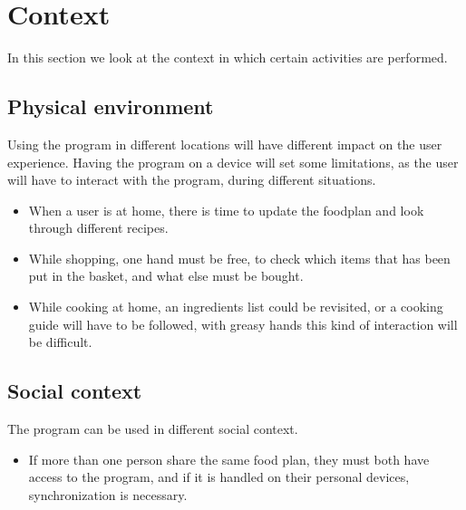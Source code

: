 \section{Context}
In this section we look at the context in which certain activities are performed.

\subsection{Physical environment}
Using the program in different locations will have different impact on the user experience. Having the program on a device will set some limitations, as the user will have to interact with the program, during different situations.
\begin{itemize}
\item When a user is at home, there is time to update the foodplan and look through different recipes.
\item While shopping, one hand must be free, to check which items that has been put in the basket, and what else must be bought.
\item While cooking at home, an ingredients list could be revisited, or a cooking guide will have to be followed, with greasy hands this kind of interaction will be difficult.
\end{itemize}

\subsection{Social context}
The program can be used in different social context.
\begin{itemize}
\item If more than one person share the same food plan, they must both have access to the program, and if it is handled on their personal devices, synchronization is necessary.
\end{itemize}
